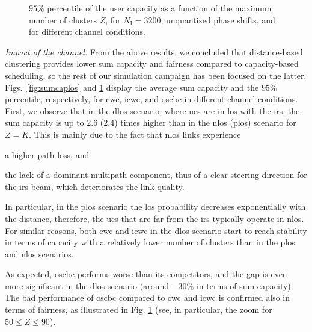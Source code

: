 \begin{figure}[t]
    \centering
       \setlength{}
    \setlength{}
    
    \caption{$95$\% percentile of the user capacity as a function of the maximum number of clusters  $Z$,  for $N_{\mathrm I}=3200$, unquantized phase shifts, and for different channel conditions.} %
    \label{fig:quantitelos}
\end{figure}

\emph{Impact of the channel.}
From the above results, we concluded that distance-based clustering provides lower sum capacity and fairness compared to capacity-based scheduling, so the rest of our simulation campaign has been focused on the latter. 
Figs.~\ref{fig:sumcaplos} and \ref{fig:quantitelos} display the average sum capacity and the $95$\% percentile, respectively, for \gls{cwc}, \gls{icwc}, and \gls{oscbc} in different channel conditions.
First, we observe that in the \gls{dlos} scenario, where \glspl{ue} are in \gls{los} with the \gls{irs}, the sum capacity is up to 2.6 (2.4) times higher than in the \gls{nlos} (\gls{plos}) scenario for $Z=K$.
This is mainly due to the fact that \gls{nlos} links experience
\begin{enumerate*}[label=(\textit{\roman*})]
  \item a higher path loss, and
  \item the lack of a dominant multipath component, thus of a clear steering direction for the \gls{irs} beam, which deteriorates the link quality. \end{enumerate*} 
In particular, in the \gls{plos} scenario the \gls{los} probability decreases exponentially with the distance, therefore, the \glspl{ue} that are far from the \gls{irs} typically operate in \gls{nlos}.
For similar reasons, both \gls{cwc} and \gls{icwc} in the \gls{dlos} scenario start to reach stability in terms of capacity with a relatively lower number of clusters than in the \gls{plos} and \gls{nlos} scenarios. 

As expected, \gls{oscbc} performs worse than its competitors, and the gap is even more significant in the \gls{dlos} scenario (around $-30\%$ in terms of sum capacity).
The bad performance of \gls{oscbc} compared to \gls{cwc} and \gls{icwc} is confirmed also in terms of fairness, as illustrated in Fig. \ref{fig:quantitelos} (see, in particular, the zoom for $50\leq Z \leq 90$).


